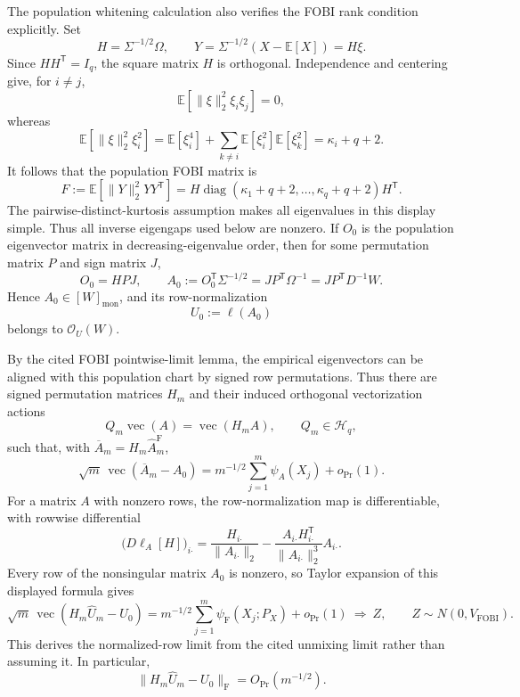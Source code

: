 The population whitening calculation also verifies the FOBI rank condition explicitly. Set
\[
 H=\Sigma^{-1/2}\Omega,
 \qquad
 Y=\Sigma^{-1/2}(X-\mathbb E[X])=H\xi.
\]
Since \(HH^{\mathsf T}=I_q\), the square matrix \(H\) is orthogonal. Independence and centering give, for \(i\neq j\),
\[
 \mathbb E\!\left[\|\xi\|_2^2\xi_i\xi_j\right]=0,
\]
whereas
\[
 \mathbb E\!\left[\|\xi\|_2^2\xi_i^2\right]
 =\mathbb E[\xi_i^4]+
   \sum_{k\neq i}\mathbb E[\xi_i^2]\mathbb E[\xi_k^2]
 =\kappa_i+q+2.
\]
It follows that the population FOBI matrix is
\[
 F:=\mathbb E[\|Y\|_2^2YY^{\mathsf T}]
 =H\operatorname{diag}(\kappa_1+q+2,\ldots,\kappa_q+q+2)H^{\mathsf T}.
\]
The pairwise-distinct-kurtosis assumption makes all eigenvalues in this display simple. Thus all inverse eigengaps used below are nonzero. If \(O_0\) is the population eigenvector matrix in decreasing-eigenvalue order, then for some permutation matrix \(P\) and sign matrix \(J\),
\[
 O_0=HPJ,
 \qquad
 A_0:=O_0^{\mathsf T}\Sigma^{-1/2}
 =JP^{\mathsf T}\Omega^{-1}
 =JP^{\mathsf T}D^{-1}W.
\]
Hence \(A_0\in[W]_{\mathrm{mon}}\), and its row-normalization
\[
 U_0:=\ell(A_0)
\]
belongs to \(\mathcal O_U(W)\).

By the cited FOBI pointwise-limit lemma, the empirical eigenvectors can be aligned with this population chart by signed row permutations. Thus there are signed permutation matrices \(H_m\) and their induced orthogonal vectorization actions
\[
 Q_m\operatorname{vec}(A)=\operatorname{vec}(H_mA),
 \qquad Q_m\in\mathcal H_q,
\]
such that, with \(\overline A_m=H_m\widehat A_m^{\mathrm F}\),
\[
 \sqrt m\,\operatorname{vec}(\overline A_m-A_0)
 =m^{-1/2}\sum_{j=1}^m\psi_A(X_j)+o_{\Pr}(1).
\]
For a matrix \(A\) with nonzero rows, the row-normalization map is differentiable, with rowwise differential
\[
 \bigl(D\ell_A[H]\bigr)_{i\boldsymbol\cdot}
 =\frac{H_{i\boldsymbol\cdot}}{\|A_{i\boldsymbol\cdot}\|_2}
 -\frac{A_{i\boldsymbol\cdot}H_{i\boldsymbol\cdot}^{\mathsf T}}
  {\|A_{i\boldsymbol\cdot}\|_2^3}A_{i\boldsymbol\cdot}.
\]
Every row of the nonsingular matrix \(A_0\) is nonzero, so Taylor expansion of this displayed formula gives
\[
 \sqrt m\,\operatorname{vec}(H_m\widehat U_m-U_0)
 =m^{-1/2}\sum_{j=1}^m\psi_{\mathrm F}(X_j;P_X)+o_{\Pr}(1)
 \ \Longrightarrow\ Z,
 \qquad
 Z\sim N(0,V_{\mathrm{FOBI}}).
\]
This derives the normalized-row limit from the cited unmixing limit rather than assuming it. In particular,
\[
 \|H_m\widehat U_m-U_0\|_{\mathrm F}=O_{\Pr}(m^{-1/2}).
\]

